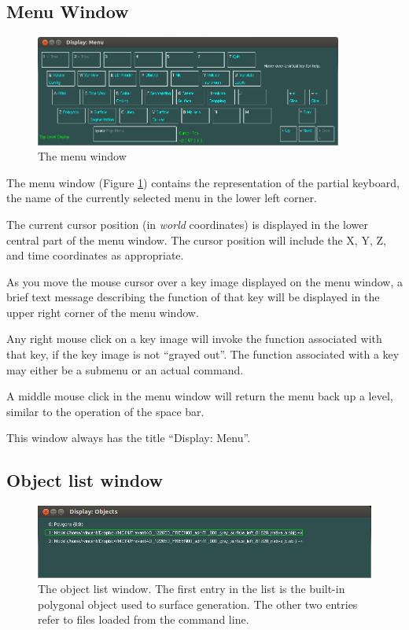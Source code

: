 \documentclass[11pt,letterpaper]{article}
\begin{document}
\subsection{Menu Window}

\begin{figure}
\centering
\includegraphics[width=0.9\textwidth]{display-top-menu.png}
\caption{The menu window}
\label{winMenu}
\end{figure}

The menu window (Figure \ref{winMenu}) contains the representation of
the partial keyboard, the name of the currently selected menu in the
lower left corner.

The current cursor position (in {\em world} coordinates) is displayed
in the lower central part of the menu window. The cursor position will
include the X, Y, Z, and time coordinates as appropriate.

As you move the mouse cursor over a key image displayed on the menu
window, a brief text message describing the function of that key will
be displayed in the upper right corner of the menu window.

Any right mouse click on a key image will invoke the function
associated with that key, if the key image is not ``grayed out''. The
function associated with a key may either be a submenu or an actual
command.

A middle mouse click in the menu window will return the menu back up a
level, similar to the operation of the space bar.

This window always has the title ``Display: Menu''.

\subsection{Object list window}

\begin{figure}
\centering
\includegraphics[width=0.9\linewidth]{display-obj-list.png}
\caption{The object list window. The first entry in the list is the built-in polygonal object used to surface generation. The other two entries refer to files loaded from the command line.}
\label{winObjList}
\end{figure}
\end{document}
